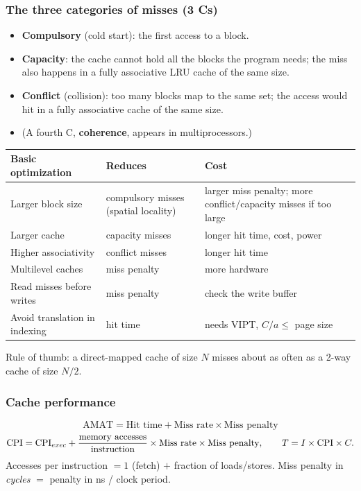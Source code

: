 \subsubsection{The three categories of misses (3 Cs)}
\begin{itemize}[leftmargin=*]
  \item \textbf{Compulsory} (cold start): the first access to a block.
  \item \textbf{Capacity}: the cache cannot hold all the blocks the program needs;
  the miss also happens in a fully associative LRU cache of the same size.
  \item \textbf{Conflict} (collision): too many blocks map to the same set; the
  access would hit in a fully associative cache of the same size.
  \item (A fourth C, \textbf{coherence}, appears in multiprocessors.)
\end{itemize}
\begin{center}
\small
\begin{tabular}{@{}p{4.2cm}p{4.6cm}p{5.4cm}@{}}
\toprule
Basic optimization & Reduces & Cost \\
\midrule
Larger block size & compulsory misses (spatial locality) & larger miss penalty; more conflict/capacity misses if too large \\
Larger cache & capacity misses & longer hit time, cost, power \\
Higher associativity & conflict misses & longer hit time \\
Multilevel caches & miss penalty & more hardware \\
Read misses before writes & miss penalty & check the write buffer \\
Avoid translation in indexing & hit time & needs VIPT, $C/a\le$ page size \\
\bottomrule
\end{tabular}
\end{center}
Rule of thumb: a direct-mapped cache of size $N$ misses about as often as a 2-way
cache of size $N/2$.

\subsubsection{Cache performance}
\[
  \text{AMAT}=\text{Hit time}+\text{Miss rate}\times\text{Miss penalty}
\]
\[
  \mathrm{CPI}=\mathrm{CPI}_{exec}+\frac{\text{memory accesses}}{\text{instruction}}\times\text{Miss rate}\times\text{Miss penalty},
  \qquad T=I\times\mathrm{CPI}\times C.
\]
Accesses per instruction $=1$ (fetch) $+$ fraction of loads/stores. Miss penalty
in \emph{cycles} $=$ penalty in ns / clock period.

